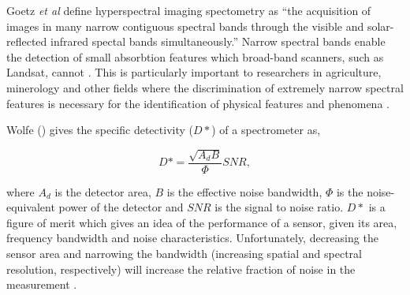 


Goetz \emph{et al} \cite{Goetz1985} define hyperspectral imaging spectometry as ``the acquisition of images in many narrow contiguous spectral bands through the visible and solar-reflected infrared spectal bands simultaneously.'' Narrow spectral bands enable the detection of small absorbtion features which broad-band scanners, such as Landsat, cannot \cite{Goetz1985}. This is particularly important to researchers in agriculture, minerology and other fields where the discrimination of extremely narrow spectral features is necessary for the identification of physical features and phenomena \cite{Goetz1985}. 

Wolfe (\cite{Wolfe1997}) gives the specific detectivity ($D*$) of a spectrometer as,

\begin{equation}
D* = \frac{\sqrt{A_d B}}{\Phi}SNR,
\end{equation}

where $A_d$ is the detector area, $B$ is the effective noise bandwidth, $\Phi$ is the noise-equivalent power of the detector and $SNR$ is the signal to noise ratio. $D*$ is a figure of merit which gives an idea of the performance of a sensor, given its area, frequency bandwidth and noise characteristics. Unfortunately, decreasing the sensor area and narrowing the bandwidth (increasing spatial and spectral resolution, respectively) will increase the relative fraction of noise in the measurement \cite{Moses2012, Wolfe2997}.

